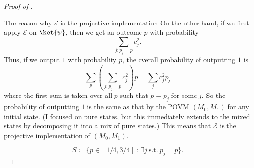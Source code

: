 \begin{proof}[Proof of ]
\begin{takashienv}{The reason why $\mathcal{E}$ is the projective implementation}
{On the other hand, if we first apply $\mathcal{E}$ on $\ket{\psi}$, then we get an outcome $p$ with probability 
\[
\sum_{j:p_{j}=p}c_{j}^2.
\]
Thus, if we output $1$ with probability $p$, the overall probability of outputting $1$ is
\[
\sum_{p}(\sum_{j:p_{j}=p}c_{j}^2)p
=\sum_{j}c_j^2 p_j
\]
where the first sum is taken over all $p$ such that $p=p_j$ for some $j$. 
So the probability of outputting $1$ is the same as that by the POVM $(M_0,M_1)$ for any initial state. (I focused on pure states, but this immediately extends to the mixed states by decomposing it into a mix of pure states.) This means that $\mathcal{E}$ is the projective implementation of $(M_0,M_1)$. 
}
\end{takashienv}

$$S \coloneqq \{p\in [1/4,3/4] ~:~ \exists j~\text{s.t.}~p_j=p\}.$$ 


\end{proof}
